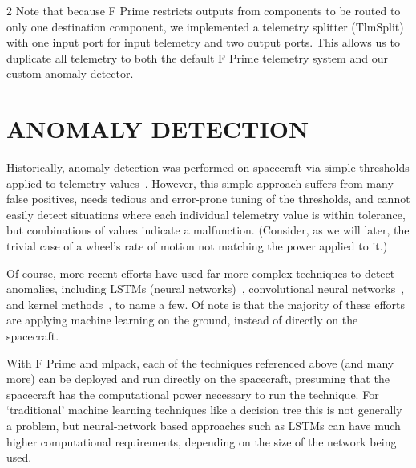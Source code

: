 \documentclass[10pt, fleqn]{article}
\begin{document}
\begin{multicols*}{2}
Note that because F Prime restricts outputs from components to be routed to only one destination component,
we implemented a telemetry splitter (TlmSplit)
with one input port for input telemetry
and two output ports.
This allows us to duplicate all telemetry to both the default F Prime telemetry system
and our custom anomaly detector.

\section{ANOMALY DETECTION}

\begin{figure}[t]
\begin{center}

\end{center}
\vspace*{-0.5em}
\label{fig:kde}
\end{figure}

Historically,
anomaly detection was performed on spacecraft via
simple thresholds applied to telemetry values~\cite{fuertes2016improving}.
However, this simple approach suffers from many false positives,
needs tedious and error-prone tuning of the thresholds,
and cannot easily detect situations where each individual telemetry value
is within tolerance, but combinations of values indicate a malfunction.
(Consider, as we will later, the trivial case of a wheel's rate of motion
not matching the power applied to it.)

Of course,
more recent efforts have used far more complex techniques to detect anomalies,
including
LSTMs (neural networks)~\cite{hundman2018detecting},
convolutional neural networks~\cite{liu2023spacecraft},
and kernel methods~\cite{fujimaki2005approach},
to name a few.
Of note is that the majority of these efforts are applying machine learning on the ground,
instead of directly on the spacecraft.

With F Prime and mlpack,
each of the techniques referenced above (and many more)
can be deployed and run directly on the spacecraft,
presuming that the spacecraft has the computational power necessary to run the technique.
For `traditional' machine learning techniques like a decision tree this is not generally a problem,
but neural-network based approaches such as LSTMs
can have much higher computational requirements,
depending on the size of the network being used.


\end{multicols*}
\end{document}
